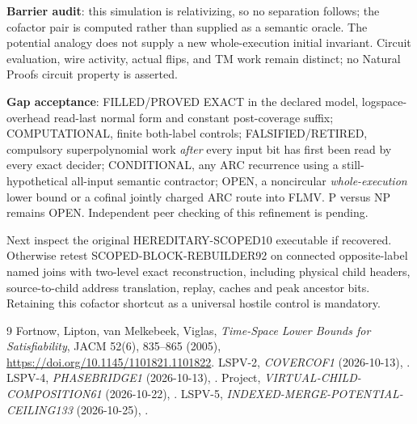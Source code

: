 \documentclass[11pt]{article}
\begin{document}
\textbf{Barrier audit}: this simulation is relativizing, so no separation follows; the cofactor pair is computed rather than supplied as a semantic oracle. The potential analogy does not supply a new whole-execution initial invariant. Circuit evaluation, wire activity, actual flips, and TM work remain distinct; no Natural Proofs circuit property is asserted.

\textbf{Gap acceptance}: FILLED/PROVED EXACT in the declared model, logspace-overhead read-last normal form and constant post-coverage suffix; COMPUTATIONAL, finite both-label controls; FALSIFIED/RETIRED, compulsory superpolynomial work \emph{after} every input bit has first been read by every exact decider; CONDITIONAL, any ARC recurrence using a still-hypothetical all-input semantic contractor; OPEN, a noncircular \emph{whole-execution} lower bound or a cofinal jointly charged ARC route into FLMV. P versus NP remains OPEN. Independent peer checking of this refinement is pending.

Next inspect the original HEREDITARY-SCOPED10 executable if recovered. Otherwise retest SCOPED-BLOCK-REBUILDER92 on connected opposite-label named joins with two-level exact reconstruction, including physical child headers, source-to-child address translation, replay, caches and peak ancestor bits. Retaining this cofactor shortcut as a universal hostile control is mandatory.

\begin{thebibliography}{9}
 Fortnow, Lipton, van Melkebeek, Viglas, \emph{Time-Space Lower Bounds for Satisfiability}, JACM 52(6), 835--865 (2005), \url{https://doi.org/10.1145/1101821.1101822}.
 LSPV-2, \emph{COVERCOF1} (2026-10-13), .
 LSPV-4, \emph{PHASEBRIDGE1} (2026-10-13), .
 Project, \emph{VIRTUAL-CHILD-COMPOSITION61} (2026-10-22), .
 LSPV-5, \emph{INDEXED-MERGE-POTENTIAL-CEILING133} (2026-10-25), .
\end{thebibliography}
\end{document}

